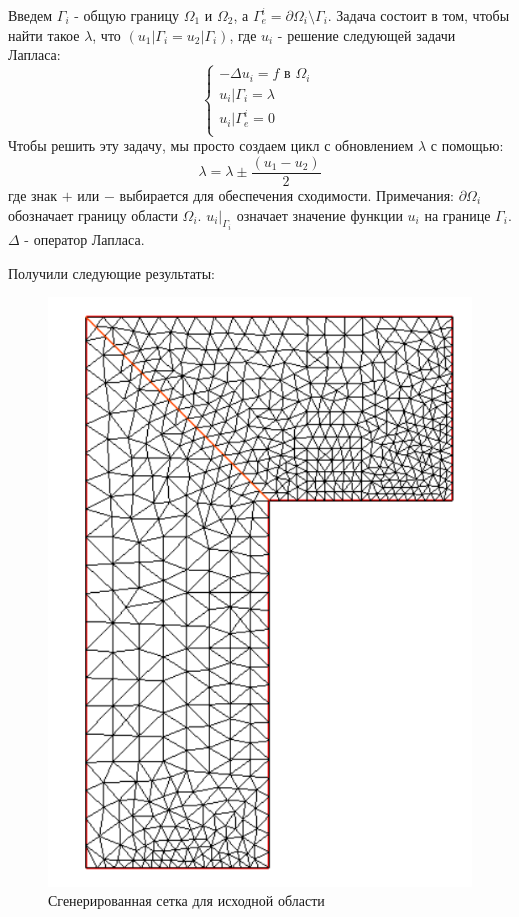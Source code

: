 \documentclass[a4paper, 12pt]{article}%
\begin{document}
	Введем $\Gamma_i$ - общую границу $\Omega_1$ и $\Omega_2$, а $\Gamma_e^i = \partial \Omega_i \setminus \Gamma_i$.
	Задача состоит в том, чтобы найти такое $\lambda$, что $(u_1|{\Gamma_i} = u_2|{\Gamma_i})$, где $u_i$ - решение следующей задачи Лапласа:
	$$
	\begin{cases}
		-\Delta u_i = f \text{ в } \Omega_i \ \\
		u_i|{\Gamma_i} = \lambda \ \\
		u_i|{\Gamma_e^i} = 0 \\
	\end{cases}
	$$
	Чтобы решить эту задачу, мы просто создаем цикл с обновлением $\lambda$ с помощью:
	$$
	\lambda = \lambda \pm \frac{(u_1 - u_2)}{2}
	$$
	где знак $+$ или $-$ выбирается для обеспечения сходимости.
	Примечания:
	$\partial\Omega_i$ обозначает границу области $\Omega_i$.
	$u_i|_{\Gamma_i}$ означает значение функции $u_i$ на границе $\Gamma_i$.
	$\Delta$ - оператор Лапласа.
	
	
	

	\newpage
	Получили следующие результаты:\\
	
	\begin{figure}[H]
		\centering
		\includegraphics[width=0.7\linewidth]{mash.png}
		\caption{Сгенерированная сетка для исходной области}
	\end{figure}
	
\end{document}
